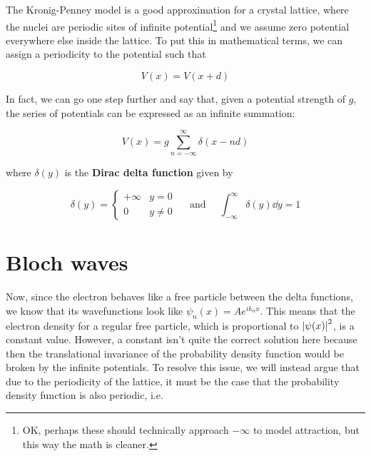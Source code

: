 The Kronig-Penney model is a good approximation for a crystal lattice, where the nuclei are periodic sites of infinite potential\footnote{OK, perhaps these should technically approach $-\infty$ to model attraction, but this way the math is cleaner.} and we assume zero potential everywhere else inside the lattice. 
To put this in mathematical terms, we can assign a periodicity to the potential such that 

\begin{equation*}
	V(x) = V(x+d)
\end{equation*}

In fact, we can go one step further and say that, given a potential strength of $g$, the series of potentials can be expressed as an infinite summation:

\begin{tcolorbox}[title = Kronig-Penney model potential] \vspace{-2ex}
	\begin{equation}
	V(x) = g \sum_{n=-\infty}^{\infty} \delta(x - nd) \label{eq:kp-pot}
	\end{equation}
\end{tcolorbox}

\noindent where $\delta(y)$ is the \textbf{Dirac delta function} given by

\begin{equation*}
	\boxed{\delta(y) = \begin{cases}
		+\infty & y=0 \\ 
		0 & y \neq 0
	\end{cases} \quad \text{ and } \quad 
	\int_{-\infty}^{\infty} \delta(y) \dd{y} = 1}
\end{equation*}


\section{Bloch waves}

Now, since the electron behaves like a free particle between the delta functions, we know that its wavefunctions look like $\psi_n(x) = Ae^{ik_nx}$. 
This means that the electron density for a regular free particle, which is proportional to $\abs{\psi(x)}^2$, is a constant value. 
However, a constant isn't quite the correct solution here because then the translational invariance of the probability density function would be broken by the infinite potentials. 
To resolve this issue, we will instead argue that due to the periodicity of the lattice, it must be the case that the probability density function is also periodic, i.e. 

